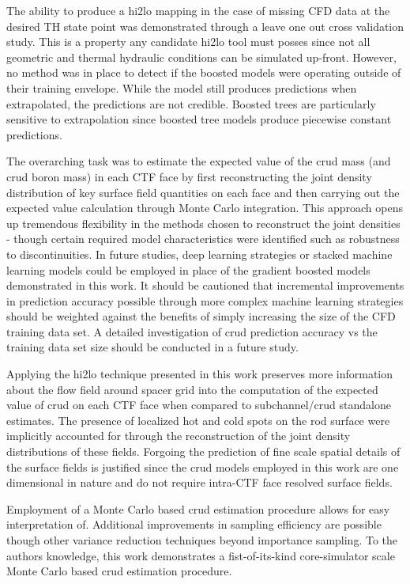 The ability to produce a hi2lo mapping in the case of missing CFD data at the desired TH state point was demonstrated through a leave one out cross validation study.  This is a property any candidate hi2lo tool must posses since not all geometric and thermal hydraulic conditions can be simulated up-front. However, no method was in place to detect if the boosted models were operating outside of their training envelope.  While the model still produces predictions when extrapolated, the predictions are not credible.  Boosted trees are particularly sensitive to extrapolation since boosted tree models produce piecewise constant predictions.

The overarching task was to estimate the expected value of the crud mass (and crud boron mass) in each CTF face by first reconstructing the joint density distribution of key surface field quantities on each face and then carrying out the expected value calculation through Monte Carlo integration.  This approach opens up tremendous flexibility in the methods chosen to reconstruct the joint densities - though certain required model characteristics were identified such as robustness to discontinuities.  In future studies, deep learning strategies or stacked machine learning models could be employed in place of the gradient boosted models demonstrated in this work.  It should be cautioned that incremental improvements in prediction accuracy possible through more complex  machine learning strategies should be weighted against the benefits of simply increasing the size of the CFD training data set.  A detailed investigation of crud prediction accuracy vs the training data set size should be conducted in a future study.

Applying the hi2lo technique presented in this work preserves more information about the flow field around spacer grid into the computation of the expected value of crud on each CTF face when compared to subchannel/crud standalone estimates.  The presence of localized hot and cold spots on the rod surface were implicitly accounted for through the reconstruction of the joint density distributions of these fields.  Forgoing the prediction of fine scale spatial details of the surface fields is justified since the crud models employed in this work are one dimensional in nature and do not require intra-CTF face resolved surface fields.

Employment of a Monte Carlo based crud estimation procedure allows for easy interpretation of.  Additional improvements in sampling efficiency are possible though other variance reduction techniques beyond importance sampling.  To the authors knowledge, this work demonstrates a fist-of-its-kind core-simulator scale Monte Carlo based crud estimation procedure.

